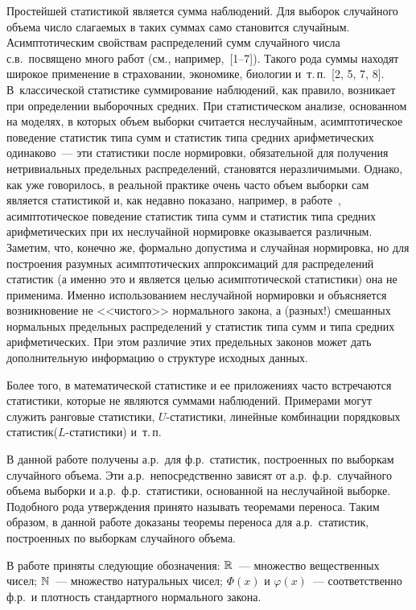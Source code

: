 \begin{multicols}{2}
Простейшей статистикой является сумма наблюдений. Для выборок
случайного объема число слагаемых в таких суммах само становится
случайным. Асимптотическим свойствам распределений сумм случайного
числа с.в.\ посвящено много работ (см., например,~[1--7]). 
Такого рода суммы находят широкое применение в страховании,
экономике, биологии и~т.\,п.~[2, 5, 7, 8]. В~классической статистике
суммирование наблюдений, как правило, возникает при определении
выборочных средних. При статистическом анализе, основанном на
моделях, в которых объем выборки считается неслучайным,
асимптотическое поведение статистик типа сумм и статистик типа
средних арифметических одинаково~--- эти статистики после нормировки,
обязательной для получения нетривиальных предельных распределений,
становятся неразличимыми. Однако, как уже говорилось, в реальной
практике очень часто объем выборки сам является статистикой и, как
недавно показано, например, в работе~\cite{24-ben}, асимптотическое
поведение статистик типа сумм и статистик типа средних
арифметических при их неслучайной нормировке оказывается различным.
Заметим, что, конечно же, формально допустима и случайная
нормировка, но для построения разумных асимптотических аппроксимаций
для распределений статистик (а именно это и является целью
асимптотической статистики) она не применима. Именно использованием
неслучайной нормировки и объясняется возникновение не <<чис\-то\-го>>
нормального закона, а (разных!) смешанных нормальных предельных
распределений у статистик типа сумм и типа средних арифметических.
При этом различие этих предельных законов может дать дополнительную
информацию о структуре исходных данных.

Более того, в математической статистике и ее приложениях часто
встречаются статистики, которые не являются суммами наблюдений.
Примерами могут служить ранговые статистики, $U$-ста\-ти\-сти\-ки,
линейные комбинации порядковых статистик\linebreak ($L$-ста\-ти\-сти\-ки) и~т.\,п.

В данной работе получены а.р.\ для
ф.р.\ статистик, построенных по выборкам
случайного объема. Эти а.р.\ непосредственно зависят от а.р.\ ф.р.\
случайного объема выборки и а.р.\ ф.р.\ статистики, основанной на
неслучайной выборке. Подобного рода утверждения принято называть
тео\-ре\-ма\-ми переноса. Таким образом, в данной работе доказаны теоремы
переноса для а.р.\ статистик, построенных по выборкам случайного
объема.

В работе приняты следующие обозначения: $\mathbb R$~--- множество
вещественных чисел; $\mathbb N$~--- множество натуральных чисел; $\Phi(x)$ и
$\varphi(x)$~--- соответственно ф.р.\ и плот\-ность стандартного
нормального закона.


\end{multicols}
